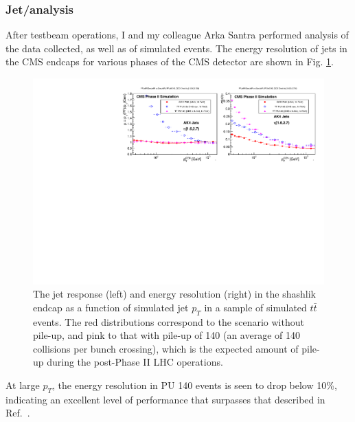 \subsubsection{Jet/\MET analysis}
After testbeam operations, I and my colleague Arka Santra performed analysis of the data collected, as well as of simulated events. The energy resolution of jets in the CMS endcaps for various phases of the CMS detector are shown in Fig. \ref{fig:ShashlikResolution}.
\begin{figure}[h]
\centering
\includegraphics[width=0.9\linewidth]{figures/CMS/Upgrade/ChsJetPerformanceEndcapTT.pdf}
\caption{The jet response (left) and energy resolution (right) in the shashlik endcap as a function of simulated jet $p_T$ in a sample of simulated $t\bar{t}$ events. The red distributions correspond to the scenario without pile-up, and pink to that with pile-up of 140 (an average of 140 collisions per bunch crossing), which is the expected amount of pile-up during the post-Phase II LHC operations. }
\label{fig:ShashlikResolution}
\end{figure}
At large $p_T$, the energy resolution in PU 140 events is seen to drop below 10\%, indicating an excellent level of performance that surpasses that described in Ref.~\cite{Bilki:2015rla}.

\FloatBarrier




